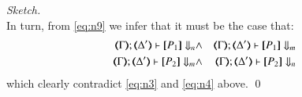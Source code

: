\begin{proof}[Sketch]
\begin{equation}
\end{equation}
In turn, from \eqref{eq:n9}
we infer that 
it must be the case that:
\begin{eqnarray*}
\mapt{\Gamma}; \mapt{\Delta'} \proves \map{P_1} \Barb{n} & \land & 
\mapt{\Gamma}; \mapt{\Delta'} \proves \map{P_1} \Barb{m} \label{eq:n10} \\
\mapt{\Gamma}; \mapt{\Delta'} \proves \map{P_2} \Barb{m} & \land & 
\mapt{\Gamma}; \mapt{\Delta'} \proves \map{P_2} \Barb{n} \label{eq:n11}
\end{eqnarray*}
which clearly contradict \eqref{eq:n3} and \eqref{eq:n4} above.
\qed
\end{proof}

